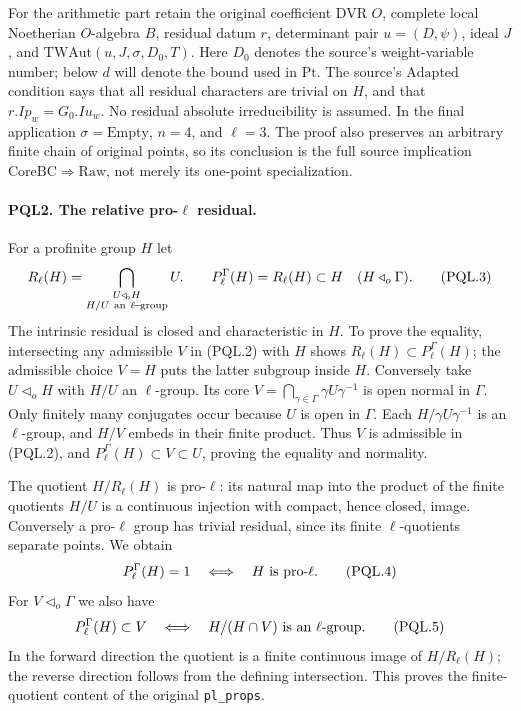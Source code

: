 For the arithmetic part retain the original coefficient DVR \(O\),
complete local Noetherian \(O\)-algebra \(B\), residual datum \(r\),
determinant pair \(u=(D,\psi)\), ideal \(J\), and
\(\mathrm{TWAut}(u,J,\sigma,D_0,T)\).
Here \(D_0\) denotes the source's weight-variable number; below \(d\)
will denote the bound used in \(\mathrm{Pt}\).
The source's \(\mathrm{Adapted}\) condition says that all residual
characters are trivial on \(H\), and that \(r.Ip_w=G_0.Iu_w\).
No residual absolute irreducibility is assumed. In the final
application \(\sigma=\mathrm{Empty}\), \(n=4\), and \(\ell=3\).
The proof also preserves an arbitrary finite chain of original
points, so its conclusion is the full source implication
\(\mathrm{CoreBC}\Rightarrow\mathrm{Raw}\), not merely its
one-point specialization.

\paragraph{PQL2. The relative pro-\(\ell\) residual.}\label{claim:PQL2}
For a profinite group \(H\) let
\[
 R_\ell(H)=\bigcap_{\substack{U\triangleleft_{\!o}H\\H/U\
                                      {\rm an}\ \ell{\rm\!-\!group}}}U .
 \qquad
 P_\ell^\Gamma(H)=R_\ell(H)\subset H
       \quad(H\triangleleft_o\Gamma).                \tag{PQL.3}
\]
The intrinsic residual is closed and characteristic in \(H\).
To prove the equality, intersecting any admissible \(V\) in
(PQL.2) with \(H\) shows \(R_\ell(H)\subset P_\ell^\Gamma(H)\);
the admissible choice \(V=H\) puts the latter subgroup inside \(H\).
Conversely take \(U\triangleleft_oH\) with \(H/U\) an
\(\ell\)-group. Its core \(V=\bigcap_{\gamma\in\Gamma}
\gamma U\gamma^{-1}\) is open normal in \(\Gamma\).
Only finitely many conjugates occur because \(U\) is open in
\(\Gamma\). Each \(H/\gamma U\gamma^{-1}\) is an
\(\ell\)-group, and \(H/V\) embeds in their finite product.
Thus \(V\) is admissible in (PQL.2), and \(P_\ell^\Gamma(H)
\subset V\subset U\), proving the equality and normality.

The quotient \(H/R_\ell(H)\) is pro-\(\ell\): its natural map
into the product of the finite quotients \(H/U\) is a continuous
injection with compact, hence closed, image. Conversely a
pro-\(\ell\) group has trivial residual, since its finite
\(\ell\)-quotients separate points. We obtain
\[
 P_\ell^\Gamma(H)=1\quad\Longleftrightarrow\quad
 H\ \hbox{is pro-}\ell.                              \tag{PQL.4}
\]
For \(V\triangleleft_o\Gamma\) we also have
\[
 P_\ell^\Gamma(H)\subset V
 \quad\Longleftrightarrow\quad H/(H\cap V)
                         \ \hbox{is an }\ell\hbox{-group}.   \tag{PQL.5}
\]
In the forward direction the quotient is a finite continuous
image of \(H/R_\ell(H)\); the reverse direction follows from
the defining intersection. This proves the finite-quotient
content of the original \texttt{pl\_props}.

